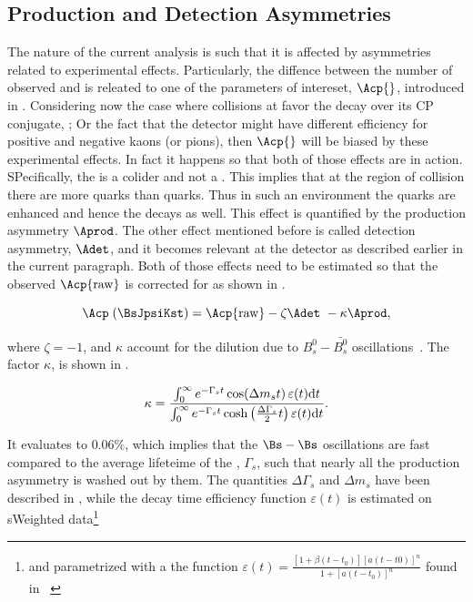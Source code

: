 \subsection{Production and Detection Asymmetries}
\label{experimentalAssym}
The nature of the current analysis is such that it is affected by asymmetries related to experimental effects.
Particularly, the diffence between the number of observed \BsJpsiKst and \BsbarJpsiKst is releated to one of
the parameters of intereset, $\Acp{}$, introduced in .
Considering now the case where collisions at \lhc favor the \BsJpsiKst decay over its CP conjugate, \BsbarJpsiKst;
Or the fact that the detector might have different efficiency for positive and negative kaons (or pions),
then $\Acp{}$ will be biased by these experimental effects. In fact it happens so that both of those effects are in action.
SPecifically, the \lhc is a \proton\proton colider and not a \proton\antiproton .
This implies that at the region of collision there are more \bquark quarks than \bquarkbar quarks.
Thus in such an environment the \bquark quarks are enhanced and hence the \BsbarJpsiKst
decays as well. This effect is quantified by the production asymmetry $\Aprod$. The other effect mentioned before
is called detection asymmetry, $\Adet$, and it becomes relevant at the \lhcb detector as described earlier in the
current paragraph. Both of those effects need to be estimated so that the observed $\Acp{\rm raw}$ is corrected for
as shown in .

\begin{equation}
\centering
\Acp\;(\BsJpsiKst) = \Acp{\rm raw} - \zeta \Adet\ - \kappa\Aprod,
\label{acp_corrected}
\end{equation}

\noindent where $\zeta = -1$, and $\kappa$ account for the dilution due to $B^0_s-\bar{B^0_s}$
oscillations~\cite{LHCb-PAPER-2013-018}. The factor $\kappa$, is shown in .

\begin{equation}
  \centering
 \kappa = \frac{\int_0^\infty  e^{-\Gamma_s t} \cos \!\left( \Delta m_s t \right ) \varepsilon(t)\mathrm{d}t}{\int_0^\infty  e^{-\Gamma_s t} \cosh \left( \frac{\Delta \Gamma_s}{2} t \right ) \varepsilon(t)\mathrm{d}t}.
\label{kappa}
\end{equation}

\noindent It evaluates to $0.06\%$, which implies that the $\Bs-\Bs$ oscillations are fast compared to the
average lifeteime of the \BBbarSyst, $\Gamma_s$, such that nearly all the production asymmetry is washed out by them.
The quantities $\Delta\Gamma_s$ and $\Delta m_s$ have been described in ,
while the decay time efficiency function $\varepsilon(t)$ is estimated on sWeighted \BsJpsiKst
data\footnote{and parametrized with a the function $\varepsilon(t)= \frac{[1+\beta(t-t_0)][a(t-t0)]^n}{1+[a(t-t_0)]^n}$ found in ~\cite{LHCb-PAPER-2014-053}}

